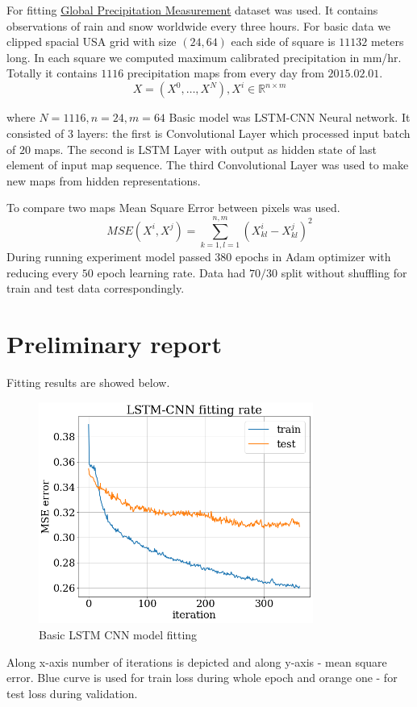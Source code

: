 \documentclass{article}
\begin{document}
For fitting \href{https://developers.google.com/earth-engine/datasets/catalog/NASA_GPM_L3_IMERG_V06#description}{Global Precipitation  Measurement} dataset was used. It contains observations of rain and snow worldwide every three hours. For basic data we clipped spacial USA grid with size $(24,64)$ each side of square is $11132$ meters long. In each square we computed maximum calibrated precipitation  in mm/hr. Totally it contains $1116$ precipitation maps from every day from $2015.02.01$.
$$X = (X^0, \dots, X^N), X^i \in \mathbb{R}^{n\times m }$$

where $N = 1116, n  = 24 , m= 64$
Basic model was LSTM-CNN Neural network. It consisted of $3$ layers: the first is Convolutional Layer which processed input batch of $20$ maps. The second is LSTM Layer with output as hidden state of last element of input map sequence. The third  Convolutional Layer was used to make new maps from hidden representations.

To compare two maps Mean Square Error between pixels was used.
$$MSE(X^i, X^j) = \sum \limits_{k = 1 ,l =1}^{n,m} (X^i_{kl} - X^j_{kl})^2$$
During running experiment model passed $380$ epochs in Adam optimizer with reducing every $50$ epoch learning rate. Data had $70/30$ split without shuffling  for train and test data correspondingly.  
\section{Preliminary report}

Fitting results are showed below. 
\begin{figure}[h!] 
\centering
\includegraphics[width=90mm]{pre_graph.png}
\caption{ Basic LSTM CNN model fitting\label{overflow}}
\end{figure}

Along x-axis number of iterations is depicted and along y-axis -  mean square error. Blue curve is used for train loss during whole epoch and orange one - for test loss during validation.
\end{document}
